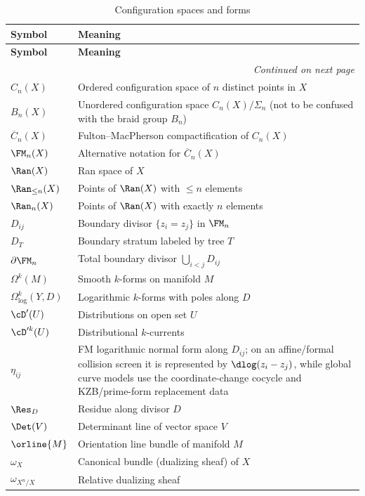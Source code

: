 \begin{longtable}{p{3cm} p{10cm}}
\caption{Configuration spaces and forms} \\
\toprule
\textbf{Symbol} & \textbf{Meaning} \\
\midrule
\endfirsthead
\toprule
\textbf{Symbol} & \textbf{Meaning} \\
\midrule
\endhead
\midrule
\multicolumn{2}{r}{\textit{Continued on next page}} \\
\endfoot
\bottomrule
\endlastfoot

$C_n(X)$ & Ordered configuration space of $n$ distinct points in $X$ \\
$B_n(X)$ & Unordered configuration space $C_n(X)/\Sigma_n$ (not to be confused with the braid group $B_n$) \\
$\overline{C}_n(X)$ & Fulton--MacPherson compactification of $C_n(X)$ \\
$\FM_n(X)$ & Alternative notation for $\overline{C}_n(X)$ \\
$\Ran(X)$ & Ran space of $X$ \\
$\Ran_{\leq n}(X)$ & Points of $\Ran(X)$ with $\leq n$ elements \\
$\Ran_n(X)$ & Points of $\Ran(X)$ with exactly $n$ elements \\
%
$D_{ij}$ & Boundary divisor $\{z_i = z_j\}$ in $\FM_n$ \\
$D_T$ & Boundary stratum labeled by tree $T$ \\
$\partial \FM_n$ & Total boundary divisor $\bigcup_{i < j} D_{ij}$ \\
$\Omega^k(M)$ & Smooth $k$-forms on manifold $M$ \\
$\Omega^k_{\log}(Y, D)$ & Logarithmic $k$-forms with poles along $D$ \\
%
$\cD'(U)$ & Distributions on open set $U$ \\
$\cD'^k(U)$ & Distributional $k$-currents \\
$\eta_{ij}$ & FM logarithmic normal form along $D_{ij}$; on an affine/formal collision screen it is represented by $\dlog(z_i - z_j)$, while global curve models use the coordinate-change cocycle and KZB/prime-form replacement data \\
$\Res_D$ & Residue along divisor $D$ \\
$\Det(V)$ & Determinant line of vector space $V$ \\
$\orline{M}$ & Orientation line bundle of manifold $M$ \\
$\omega_X$ & Canonical bundle (dualizing sheaf) of $X$ \\
$\omega_{X^n/X}$ & Relative dualizing sheaf \\
\end{longtable}


